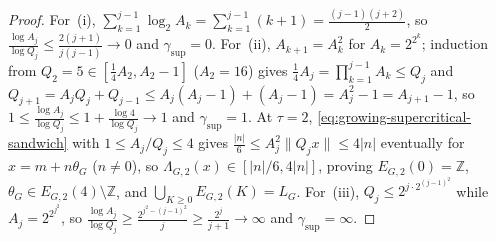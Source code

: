 \documentclass[11pt]{article}
\theoremstyle{definition}
\theoremstyle{remark}
\newcommand{\Z}{\mathbb{Z}}
\newcommand{\Lam}{\Lambda}
\begin{document}
\begin{proof}
For~(i), $\sum_{k=1}^{j-1}\log_2 A_k=\sum_{k=1}^{j-1}(k+1)=\frac{(j-1)(j+2)}{2}$,
so $\frac{\log A_j}{\log Q_j}\le\frac{2(j+1)}{j(j-1)}\to0$ and $\gamma_{\sup}=0$.
For~(ii), $A_{k+1}=A_k^2$ for $A_k=2^{2^k}$; induction from $Q_2=5\in[\frac14 A_2,A_2-1]$
($A_2=16$) gives $\frac14 A_j=\prod_{k=1}^{j-1}A_k\le Q_j$ and
$Q_{j+1}=A_jQ_j+Q_{j-1}\le A_j(A_j-1)+(A_j-1)=A_j^2-1=A_{j+1}-1$, so
$1\le\frac{\log A_j}{\log Q_j}\le 1+\frac{\log 4}{\log Q_j}\to1$ and $\gamma_{\sup}=1$.
At $\tau=2$, \eqref{eq:growing-supercritical-sandwich} with $1\le A_j/Q_j\le 4$
gives $\frac{|n|}{6}\le A_j^2\|Q_j x\|\le 4|n|$ eventually for $x=m+n\theta_G$ ($n\ne0$),
so $\Lam_{G,2}(x)\in[|n|/6,4|n|]$, proving $E_{G,2}(0)=\Z$, $\theta_G\in E_{G,2}(4)\setminus\Z$,
and $\bigcup_{K\ge0}E_{G,2}(K)=L_G$. For~(iii), $Q_j\le 2^{j\cdot 2^{(j-1)^2}}$ while
$A_j=2^{2^{j^2}}$, so $\frac{\log A_j}{\log Q_j}\ge\frac{2^{j^2-(j-1)^2}}{j}\ge\frac{2^j}{j+1}\to\infty$
and $\gamma_{\sup}=\infty$.
\end{proof}
\end{document}
